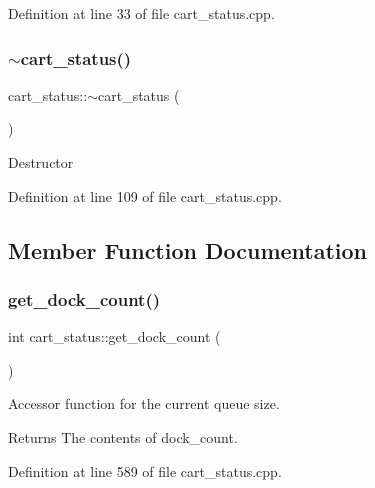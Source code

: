 Definition at line 33 of file cart\+\_\+status.\+cpp.

\mbox{\label{classcart__status_a36ae36b8682afa50ecaa568285b1b32c}} 
\subsubsection{\texorpdfstring{$\sim$cart\+\_\+status()}{~cart\_status()}}
{\footnotesize\ttfamily cart\+\_\+status\+::$\sim$cart\+\_\+status (\begin{DoxyParamCaption}{ }\end{DoxyParamCaption})}

Destructor 

Definition at line 109 of file cart\+\_\+status.\+cpp.



\subsection{Member Function Documentation}
\mbox{\label{classcart__status_afcd6d162f250b09bd84770ba3a26921d}} 
\subsubsection{\texorpdfstring{get\+\_\+dock\+\_\+count()}{get\_dock\_count()}}
{\footnotesize\ttfamily int cart\+\_\+status\+::get\+\_\+dock\+\_\+count (\begin{DoxyParamCaption}{ }\end{DoxyParamCaption})}

Accessor function for the current queue size. \begin{DoxyReturn}{Returns}
The contents of dock\+\_\+count. 
\end{DoxyReturn}


Definition at line 589 of file cart\+\_\+status.\+cpp.

\mbox{\label{classcart__status_a0d27f176b4de4131070be2b4e110444c}} 
